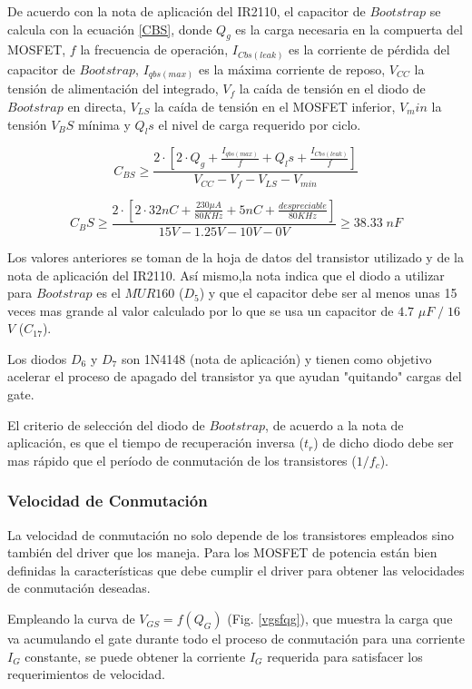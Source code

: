 \documentclass[11pt, a4paper]{article}
\begin{document}
De acuerdo con la nota de aplicación del IR2110, el capacitor de $Bootstrap$ se calcula con la ecuación \ref{CBS}, donde $Q_g$ es la carga necesaria en la compuerta del MOSFET, $f$ la frecuencia de operación, $I_{Cbs(leak)}$  es la corriente de pérdida del capacitor de $Bootstrap$, $I_{qbs(max)}$ es la máxima corriente de reposo, $V_{CC}$ la tensión de alimentación del integrado, $V_f$ la caída de tensión en el diodo de $Bootstrap$ en directa, $V_{LS}$ la caída de tensión en el MOSFET inferior, $V_min$ la tensión $V_BS$ mínima y $Q_ls$ el nivel de carga requerido por ciclo.

\begin{equation}
C_{BS} \geq \frac{ 2 \cdot [2\cdot Q_g + \frac{I_{qbs(max)}}{f} + Q_ls + \frac{I_{Cbs(leak)}}{f}]}{V_{CC} - V_f - V_{LS} - V_{min}}
\label{CBS} 
\end{equation}

\[ C_BS \geq \frac{ 2 \cdot [2\cdot 32nC + \frac{230 \mu A}{80 KHz} + 5 nC + \frac{despreciable}{80 KHz}]}{15 V - 1.25 V - 10 V - 0 V} \geq 38.33 \; nF \]

Los valores anteriores se toman de la hoja de datos del transistor utilizado y de la nota de aplicación del IR2110. Así mismo,la nota indica que el diodo a utilizar para $Bootstrap$ es el $MUR160$ ($D_5$) y que el capacitor debe ser al menos unas 15 veces mas grande al valor calculado por lo que se usa un capacitor de $4.7$ $\mu F\; /\; 16$ $V$ ($C_{17}$).

Los diodos $D_6$ y $D_7$ son 1N4148 (nota de aplicación) y tienen como objetivo acelerar el proceso de apagado del transistor ya que ayudan "quitando" cargas del gate.

El criterio de selección del diodo de $Bootstrap$, de acuerdo a la nota de aplicación, es que el tiempo de recuperación inversa ($t_r$) de dicho diodo debe ser mas rápido que el período de conmutación de los transistores ($1/f_c$).

\subsubsection{Velocidad de Conmutación}
La velocidad de conmutación no solo depende de los transistores empleados sino también del driver que los maneja. Para los MOSFET de potencia están bien definidas la características que debe cumplir el driver para obtener las velocidades de conmutación deseadas.

Empleando la curva de $V_{GS} = f(Q_G)$ (Fig. \ref{vgsfqg}), que muestra la carga que va acumulando el gate durante todo el proceso de conmutación para una corriente $I_G$ constante, se puede obtener la corriente $I_G$ requerida para satisfacer los requerimientos de velocidad.
\end{document}
